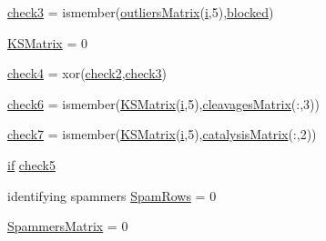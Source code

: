 \begin{DoxyCompactItemize}
\item 
\hyperlink{a00030_adfd17509248a56986475a25ee50fe488}{check3} = ismember(\hyperlink{a00030_a9733b61dd859b1133aa3aa849cf70cbc}{outliers\+Matrix}(\hyperlink{a00113_ad3efca1ea6e3333daf30719ee0501862}{i},5),\hyperlink{a00030_a1faaaae288fc8ca4ed1751049aa2f84f}{blocked})
\item 
\hyperlink{a00030_aea43faf8d3d68de03c645edc96b0c1c0}{K\+S\+Matrix} = 0
\item 
\hyperlink{a00030_ab21c5bac10f7ac73374c002e908df5ac}{check4} = xor(\hyperlink{a00030_a98a8838a85ed24032563a44271b1525a}{check2},\hyperlink{a00030_adfd17509248a56986475a25ee50fe488}{check3})
\item 
\hyperlink{a00030_a0c9b097ea561ab0f23a69197786a243a}{check6} = ismember(\hyperlink{a00030_ab18f9eabd5f873bd17d226d786bc22df}{K\+S\+Matrix}(\hyperlink{a00113_ad3efca1ea6e3333daf30719ee0501862}{i},5),\hyperlink{a00030_a90d1d83fdcae4fb1cba5129d5820d33c}{cleavages\+Matrix}(\+:,3))
\item 
\hyperlink{a00030_a0bbe7d2ceb7b248f0826d069d5a1b735}{check7} = ismember(\hyperlink{a00030_ab18f9eabd5f873bd17d226d786bc22df}{K\+S\+Matrix}(\hyperlink{a00113_ad3efca1ea6e3333daf30719ee0501862}{i},5),\hyperlink{a00030_a244eec8903103b5bbddef461276286ce}{catalysis\+Matrix}(\+:,2))
\item 
\hyperlink{a00030_a01d55766b8058903dd360b4bda71f9f5}{if} \hyperlink{a00030_abee07c73829351d18ba356c86e3e096d}{check5}
\item 
identifying spammers \hyperlink{a00030_aa9cffa4c2d9962c67a719b05a414e478}{Spam\+Rows} = 0
\item 
\hyperlink{a00030_af1801174c9397e7fad0394203f120c31}{Spammers\+Matrix} = 0
\end{DoxyCompactItemize}


